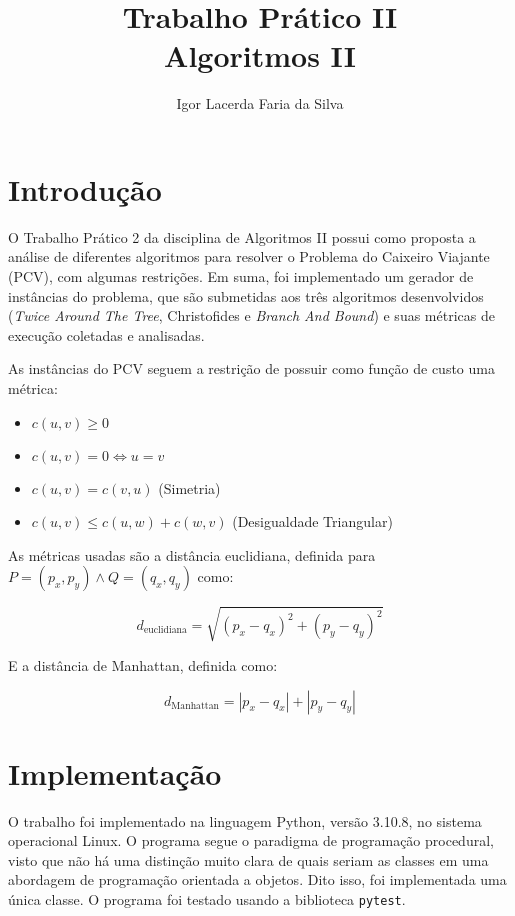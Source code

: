 \documentclass{article}
\author{Igor Lacerda Faria da Silva}
\title{Trabalho Prático II \\
Algoritmos II}
\date{}
\begin{document}
\maketitle

\section{Introdução}

O Trabalho Prático 2 da disciplina de Algoritmos II possui como proposta a análise de diferentes algoritmos para resolver o Problema do Caixeiro Viajante (PCV), com algumas restrições. Em suma, foi implementado um gerador de instâncias do problema, que são submetidas aos três algoritmos desenvolvidos (\textit{Twice Around The Tree}, Christofides e \textit{Branch And Bound}) e suas métricas de execução coletadas e analisadas.

As instâncias do PCV seguem a restrição de possuir como função de custo uma métrica:
\begin{itemize}

	\item \( c(u,v) \geq 0 \)

	\item \( c(u,v) = 0  \Leftrightarrow  u = v \)

	\item \( c(u,v) = c(v,u) \) (Simetria)

	\item \( c(u,v) \leq c(u,w) + c(w,v) \) (Desigualdade Triangular)

\end{itemize}

As métricas usadas são a distância euclidiana, definida para \( P = (p_x,p_y) \land Q=(q_x,q_y) \) como:

\[ d_{\textrm{euclidiana}} = \sqrt{ (p_x-q_x)^{2} + (p_y-q_y)^2 } \]

E a distância de Manhattan, definida como:

\[ d_{\textrm{Manhattan}} = | p_x - q_x | + | p_y - q_y | \]


\section{Implementação}

O trabalho foi implementado na linguagem Python, versão 3.10.8, no sistema operacional Linux. O programa segue o paradigma de programação procedural, visto que não há uma distinção muito clara de quais seriam as classes em uma abordagem de programação orientada a objetos. Dito isso, foi implementada uma única classe. O programa foi testado usando a biblioteca \texttt{pytest}.
\end{document}
